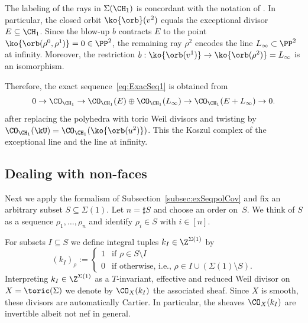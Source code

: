 \begin{exam}
{\begin{figure}[ht]
\newcommand{\spaceA}{\hspace*{3.5em}}
\newcommand{\scaleA}{0.8}
\spaceA
{}
\spaceA
{}
\caption{\;}
\label{fig:fanH1}
\end{figure}

The labeling of the rays in $\Sigma(\CH_1)$ is concordant 
with the notation of . In particular, the closed orbit
$\ko{\orb}(v^2)$ equals the exceptional divisor $E\subseteq\CH_1$.
Since the blow-up $b$ contracts $E$ to 
the point $\ko{\orb(\rho^0,\rho^1)}=0\in\PP^2$, the remaining ray
$\rho^2$ encodes the line $L_\infty\subset\PP^2$ at infinity.
Moreover, the restriction 
$b:\ko{\orb(v^1)}\to\ko{\orb(\rho^2)}=L_{\infty}$ is an isomorphism.

Therefore, the exact sequence~\eqref{eq:ExacSeq1} is obtained from 
$$
0\to \CO_{\CH_1} \to \CO_{\CH_1}(E)\oplus
\CO_{\CH_1}(L_\infty)\to\CO_{\CH_1}(E+L_\infty)\to 0.
$$
after replacing the polyhedra with toric Weil divisors and twisting 
by $\CO_{\CH_1}(\kU)=\CO_{\CH_1}(\ko{\orb(u^2)})$. This the 
Koszul complex of the exceptional line and the line at infinity.
}
\end{exam}

\subsection{Dealing with non-faces}
\label{subsec:pc}
Next we {apply the formalism of 
Subsection~\ref{subsec:exSeqpolCov} and} 
fix an arbitrary subset $S\subseteq\Sigma(1)$. 
Let $n=\sharp S$ {and choose} an order
on~$S$. {We think} of $S$ as a sequence
$\rho_1,\ldots,\rho_n$ and identify $\rho_i\in S$ 
with $i\in[n]$.

For subsets $I\subseteq S$ we define integral
tuples $k_I\in\Z^{\Sigma(1)}$ by
$$
(k_I)_\rho:=\left\{
\begin{array}{ll}
1 & \mbox{if } \rho\in S\setminus I\\
0 & \mbox{if otherwise, i.e., }\rho\in I\cup 
(\Sigma(1)\setminus S).
\end{array}\right.
$$
Interpreting $k_I\in\Z^{\Sigma(1)}$ as a
$T$-invariant, effective and reduced Weil divisor 
on $X=\toric(\Sigma)$ we denote by $\CO_X(k_I)$ 
the associated sheaf. Since $X$ is smooth, these 
divisors are automatically Cartier. In particular,
the sheaves $\CO_X(k_I)$ are invertible albeit not
nef in general.

